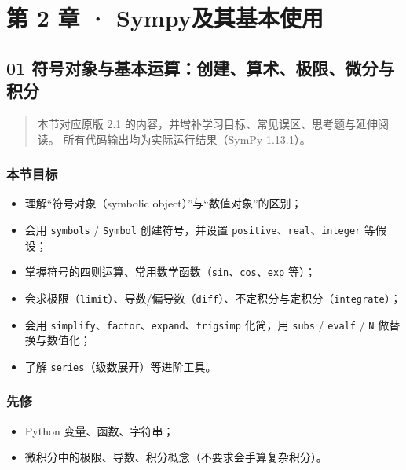 \chapter{第 2 章 ·
Sympy及其基本使用}\label{ux7b2c-2-ux7ae0-sympyux53caux5176ux57faux672cux4f7fux7528}

\section{01
符号对象与基本运算：创建、算术、极限、微分与积分}\label{ux7b26ux53f7ux5bf9ux8c61ux4e0eux57faux672cux8fd0ux7b97ux521bux5efaux7b97ux672fux6781ux9650ux5faeux5206ux4e0eux79efux5206}

\begin{quote}
本节对应原版 2.1 的内容，并增补学习目标、常见误区、思考题与延伸阅读。
所有代码输出均为实际运行结果（SymPy 1.13.1）。
\end{quote}

\subsection{本节目标}\label{ux672cux8282ux76eeux6807-11}

\begin{itemize}
\tightlist
\item
  理解``符号对象（symbolic object）''与``数值对象''的区别；
\item
  会用 \texttt{symbols} / \texttt{Symbol} 创建符号，并设置
  \texttt{positive}、\texttt{real}、\texttt{integer} 等假设；
\item
  掌握符号的四则运算、常用数学函数（\texttt{sin}、\texttt{cos}、\texttt{exp}
  等）；
\item
  会求极限（\texttt{limit}）、导数/偏导数（\texttt{diff}）、不定积分与定积分（\texttt{integrate}）；
\item
  会用
  \texttt{simplify}、\texttt{factor}、\texttt{expand}、\texttt{trigsimp}
  化简，用 \texttt{subs} / \texttt{evalf} / \texttt{N} 做替换与数值化；
\item
  了解 \texttt{series}（级数展开）等进阶工具。
\end{itemize}

\subsection{先修}\label{ux5148ux4fee-4}

\begin{itemize}
\tightlist
\item
  Python 变量、函数、字符串；
\item
  微积分中的极限、导数、积分概念（不要求会手算复杂积分）。
\end{itemize}

